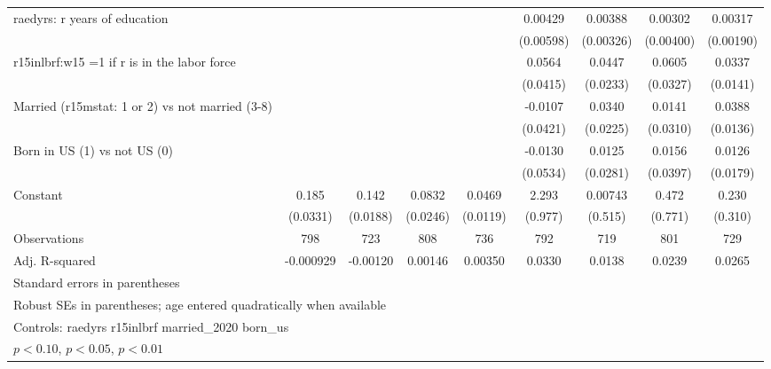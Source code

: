 \begin{table}[htbp]
\begin{tabular}{l*{8}{c}}
\addlinespace
raedyrs: r years of education&                  &                  &                  &                  &  0.00429         &  0.00388         &  0.00302         &  0.00317\sym{*}  \\
                &                  &                  &                  &                  &(0.00598)         &(0.00326)         &(0.00400)         &(0.00190)         \\
\addlinespace
r15inlbrf:w15 =1 if r is in the labor force&                  &                  &                  &                  &   0.0564         &   0.0447\sym{*}  &   0.0605\sym{*}  &   0.0337\sym{**} \\
                &                  &                  &                  &                  & (0.0415)         & (0.0233)         & (0.0327)         & (0.0141)         \\
\addlinespace
Married (r15mstat: 1 or 2) vs not married (3-8)&                  &                  &                  &                  &  -0.0107         &   0.0340         &   0.0141         &   0.0388\sym{***}\\
                &                  &                  &                  &                  & (0.0421)         & (0.0225)         & (0.0310)         & (0.0136)         \\
\addlinespace
Born in US (1) vs not US (0)&                  &                  &                  &                  &  -0.0130         &   0.0125         &   0.0156         &   0.0126         \\
                &                  &                  &                  &                  & (0.0534)         & (0.0281)         & (0.0397)         & (0.0179)         \\
\addlinespace
Constant        &    0.185\sym{***}&    0.142\sym{***}&   0.0832\sym{***}&   0.0469\sym{***}&    2.293\sym{**} &  0.00743         &    0.472         &    0.230         \\
                & (0.0331)         & (0.0188)         & (0.0246)         & (0.0119)         &  (0.977)         &  (0.515)         &  (0.771)         &  (0.310)         \\
\midrule
Observations    &      798         &      723         &      808         &      736         &      792         &      719         &      801         &      729         \\
Adj. R-squared  &-0.000929         & -0.00120         &  0.00146         &  0.00350         &   0.0330         &   0.0138         &   0.0239         &   0.0265         \\
\bottomrule
\multicolumn{9}{l}{\footnotesize Standard errors in parentheses}\\
\multicolumn{9}{l}{\footnotesize Robust SEs in parentheses; age entered quadratically when available}\\
\multicolumn{9}{l}{\footnotesize Controls:  raedyrs r15inlbrf married\_2020 born\_us}\\
\multicolumn{9}{l}{\footnotesize \sym{*} \(p<0.10\), \sym{**} \(p<0.05\), \sym{***} \(p<0.01\)}\\
\end{tabular}
\end{table}

